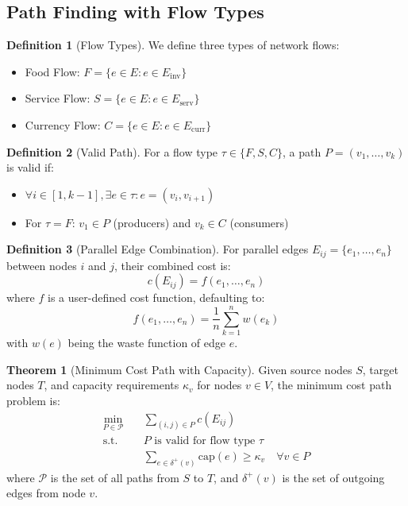 \documentclass[12pt]{article}
\theoremstyle{definition}
\newtheorem{definition}{Definition}
\newtheorem{theorem}{Theorem}
\begin{document}
\subsection{Path Finding with Flow Types}
\begin{definition}[Flow Types]
We define three types of network flows:
\begin{itemize}
    \item Food Flow: $F = \{e \in E : e \in E_{\text{inv}}\}$
    \item Service Flow: $S = \{e \in E : e \in E_{\text{serv}}\}$
    \item Currency Flow: $C = \{e \in E : e \in E_{\text{curr}}\}$
\end{itemize}
\end{definition}

\begin{definition}[Valid Path]
For a flow type $\tau \in \{F, S, C\}$, a path $P = (v_1, \ldots, v_k)$ is valid if:
\begin{itemize}
    \item $\forall i \in [1,k-1], \exists e \in \tau : e = (v_i, v_{i+1})$
    \item For $\tau = F$: $v_1 \in P$ (producers) and $v_k \in C$ (consumers)
\end{itemize}
\end{definition}

\begin{definition}[Parallel Edge Combination]
For parallel edges $E_{ij} = \{e_1, \ldots, e_n\}$ between nodes $i$ and $j$, their combined cost is:
\begin{equation}
    c(E_{ij}) = f(e_1, \ldots, e_n)
\end{equation}
where $f$ is a user-defined cost function, defaulting to:
\begin{equation}
    f(e_1, \ldots, e_n) = \frac{1}{n}\sum_{k=1}^n w(e_k)
\end{equation}
with $w(e)$ being the waste function of edge $e$.
\end{definition}

\begin{theorem}[Minimum Cost Path with Capacity]
Given source nodes $S$, target nodes $T$, and capacity requirements $\kappa_v$ for nodes $v \in V$, the minimum cost path problem is:
\begin{align*}
    \min_{P \in \mathcal{P}} \quad & \sum_{(i,j) \in P} c(E_{ij}) \\
    \text{s.t.} \quad & P \text{ is valid for flow type } \tau \\
    & \sum_{e \in \delta^+(v)} \text{cap}(e) \geq \kappa_v \quad \forall v \in P
\end{align*}
where $\mathcal{P}$ is the set of all paths from $S$ to $T$, and $\delta^+(v)$ is the set of outgoing edges from node $v$.
\end{theorem}
\end{document}
